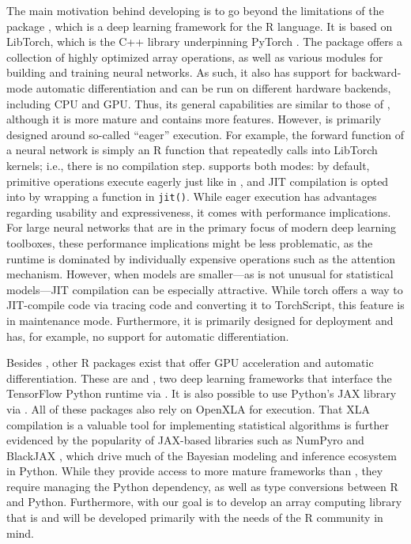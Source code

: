 The main motivation behind developing  is to go beyond the limitations of the  package \citep{ref-rtorch}, which is a deep learning framework for the R language.
It is based on LibTorch, which is the C++ library underpinning PyTorch \citep{ref-pytorch}.
The  package offers a collection of highly optimized array operations, as well as various modules for building and training neural networks.
As such, it also has support for backward-mode automatic differentiation and can be run on different hardware backends, including CPU and GPU.
Thus, its general capabilities are similar to those of , although it is more mature and contains more features.
However,  is primarily designed around so-called ``eager'' execution.
For example, the forward function of a neural network is simply an R function that repeatedly calls into LibTorch kernels; i.e., there is no compilation step.
 supports both modes: by default, primitive operations execute eagerly just like in , and JIT compilation is opted into by wrapping a function in \texttt{jit()}.
While eager execution has advantages regarding usability and expressiveness, it comes with performance implications.
For large neural networks that are in the primary focus of modern deep learning toolboxes, these performance implications might be less problematic, as the runtime is dominated by individually expensive operations such as the attention mechanism.
However, when models are smaller---as is not unusual for statistical models---JIT compilation can be especially attractive.
While torch offers a way to JIT-compile code via tracing code and converting it to TorchScript, this feature is in maintenance mode.
Furthermore, it is primarily designed for deployment and has, for example, no support for automatic differentiation.

Besides , other R packages exist that offer GPU acceleration and automatic differentiation.
These are  and , two deep learning frameworks that interface the TensorFlow Python runtime via .
It is also possible to use Python's JAX library via  \citep{ref-jax}.
All of these packages also rely on OpenXLA for execution.
That XLA compilation is a valuable tool for implementing statistical algorithms is further evidenced by the popularity of JAX-based libraries such as NumPyro \citep{ref-numpyro} and BlackJAX \citep{ref-blackjax}, which drive much of the Bayesian modeling and inference ecosystem in Python.
While they provide access to more mature frameworks than , they require managing the Python dependency, as well as type conversions between R and Python.
Furthermore, with  our goal is to develop an array computing library that is and will be developed primarily with the needs of the R community in mind.

